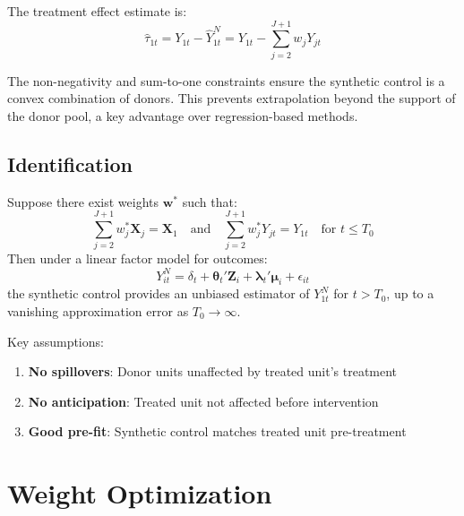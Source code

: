 The treatment effect estimate is:
\begin{equation}
    \hat{\tau}_{1t} = Y_{1t} - \hat{Y}_{1t}^N = Y_{1t} - \sum_{j=2}^{J+1} w_j Y_{jt}
    \label{eq:scm_tau_hat}
\end{equation}

\begin{remark}
The non-negativity and sum-to-one constraints ensure the synthetic control is a convex combination of donors. This prevents extrapolation beyond the support of the donor pool, a key advantage over regression-based methods.
\end{remark}

\subsection{Identification}

\begin{theorem}
\label{thm:scm_id}
Suppose there exist weights $\mathbf{w}^*$ such that:
\begin{equation}
    \sum_{j=2}^{J+1} w_j^* \mathbf{X}_j = \mathbf{X}_1 \quad \text{and} \quad \sum_{j=2}^{J+1} w_j^* Y_{jt} = Y_{1t} \quad \text{for } t \leq T_0
\end{equation}
Then under a linear factor model for outcomes:
\begin{equation}
    Y_{it}^N = \delta_t + \boldsymbol{\theta}_t' \mathbf{Z}_i + \boldsymbol{\lambda}_t' \boldsymbol{\mu}_i + \epsilon_{it}
\end{equation}
the synthetic control provides an unbiased estimator of $Y_{1t}^N$ for $t > T_0$, up to a vanishing approximation error as $T_0 \to \infty$.
\end{theorem}

Key assumptions:
\begin{enumerate}
    \item \textbf{No spillovers}: Donor units unaffected by treated unit's treatment
    \item \textbf{No anticipation}: Treated unit not affected before intervention
    \item \textbf{Good pre-fit}: Synthetic control matches treated unit pre-treatment
\end{enumerate}

\section{Weight Optimization}
\label{sec:scm_weights}

